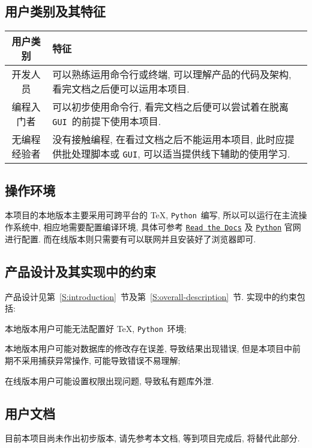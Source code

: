 \documentclass{ctexart}
\newcommand{\python}{\texttt{Python}}
\newcommand{\readthedocs}{\texttt{Read the Docs}}
\newcommand{\gui}{\texttt{GUI}}
\begin{document}
\subsection{用户类别及其特征}
\begin{center}
    \begin{tabularx}{\textwidth}{cX}
        \toprule
            用户类别 & 特征 \\
        \midrule
        \rowcolor[HTML]{EFEFEF}
            开发人员 & 可以熟练运用命令行或终端, 可以理解产品的代码及架构, 看完文档之后便可以运用本项目. \\
            编程入门者 & 可以初步使用命令行, 看完文档之后便可以尝试着在脱离 \gui\ 的前提下使用本项目. \\
            无编程经验者 & 没有接触编程, 在看过文档之后不能运用本项目, 此时应提供批处理脚本或 \gui, 可以适当提供线下辅助的使用学习. \\
        \bottomrule
    \end{tabularx}
\end{center}


\subsection{操作环境}
本项目的本地版本主要采用可跨平台的 \TeX, \python\ 编写, 所以可以运行在主流操作系统中, 相应地需要配置编译环境, 具体可参考 \href{https://tex.readthedocs.io}{\readthedocs} 及 \href{https://wiki.python.org/moin/BeginnersGuide/Download}{\python} 官网进行配置. 而在线版本则只需要有可以联网并且安装好了浏览器即可.


\subsection{产品设计及其实现中的约束}
产品设计见第~\ref{S:introduction}~节及第~\ref{S:overall-description}~节. 实现中的约束包括: \begin{enumerate*}[label=\textbf{(\arabic*)}]
    \item 本地版本用户可能无法配置好 \TeX, \python\ 环境;
    \item 本地版本用户可能对数据库的修改存在误差, 导致结果出现错误, 但是本项目中前期不采用捕获异常操作, 可能导致错误不易理解;
    \item 在线版本用户可能设置权限出现问题, 导致私有题库外泄.
\end{enumerate*}


\subsection{用户文档}
目前本项目尚未作出初步版本, 请先参考本文档, 等到项目完成后, 将替代此部分.
\end{document}

